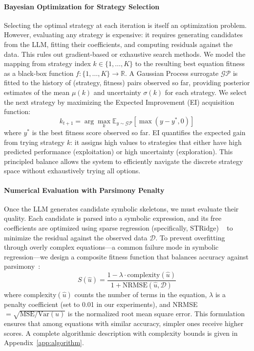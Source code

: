 \documentclass[twoside,11pt]{article}
\newcommand{\1}{{\bf 1}}
\newcommand{\0}{{\bf 0}}
\begin{document}
\paragraph{Bayesian Optimization for Strategy Selection} Selecting the optimal strategy at each iteration is itself an optimization problem. However, evaluating any strategy is expensive: it requires generating candidates from the LLM, fitting their coefficients, and computing residuals against the data. This rules out gradient-based or exhaustive search methods.
We model the mapping from strategy index $k \in \{1, \ldots, K\}$ to the resulting best equation fitness as a black-box function $f: \{1,\ldots,K\} \rightarrow \mathbb{R}$. A Gaussian Process surrogate $\mathcal{GP}$ is fitted to the history of (strategy, fitness) pairs observed so far, providing posterior estimates of the mean $\mu(k)$ and uncertainty $\sigma(k)$ for each strategy. We select the next strategy by maximizing the Expected Improvement (EI) acquisition function:
\begin{equation}
    k_{t+1} = \arg\max_{k} \mathbb{E}_{y \sim \mathcal{GP}}\left[\max(y - y^*, 0)\right]
\end{equation}
where $y^*$ is the best fitness score observed so far. EI quantifies the expected gain from trying strategy $k$: it assigns high values to strategies that either have high predicted performance (exploitation) or high uncertainty (exploration). This principled balance allows the system to efficiently navigate the discrete strategy~\citep{baptista2018bocs} space without exhaustively trying all options.

\paragraph{Numerical Evaluation with Parsimony Penalty} Once the LLM generates candidate symbolic skeletons, we must evaluate their quality. Each candidate is parsed into a symbolic expression, and its free coefficients are optimized using sparse regression (specifically, STRidge) ~\citep{tibshirani1996lasso} to minimize the residual against the observed data $\mathcal{D}$. To prevent overfitting through overly complex equations---a common failure mode in symbolic regression---we design a composite fitness function that balances accuracy against parsimony~\citep{bartlett2024mdl,burlacu2019parsimony}:
\begin{equation}
    S(\hat{u}) = \frac{1 - \lambda \cdot \text{complexity}(\hat{u})}{1 + \text{NRMSE}(\hat{u}, \mathcal{D})}
\end{equation}
where $\text{complexity}(\hat{u})$ counts the number of terms in the equation, $\lambda$ is a penalty coefficient (set to 0.01 in our experiments), and NRMSE $= \sqrt{\text{MSE}/\text{Var}(u)}$ is the normalized root mean square error. This formulation ensures that among equations with similar accuracy, simpler ones receive higher scores. A complete algorithmic description with complexity bounds is given in Appendix~\ref{app:algorithm}.
\end{document}
